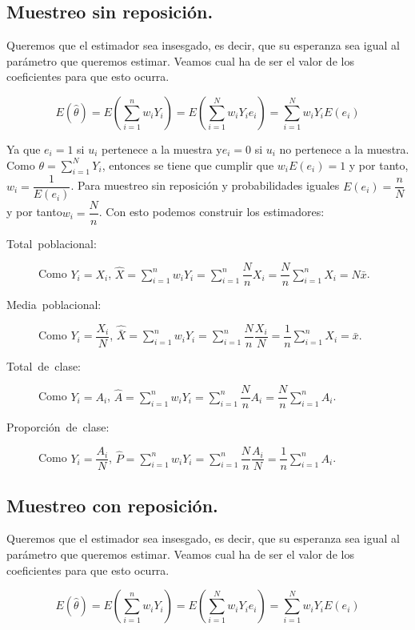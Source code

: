 \subsection{Muestreo sin reposici\'on.}

Queremos que el estimador sea insesgado, es decir, que su esperanza
sea igual al par\'ametro que queremos estimar. Veamos cual ha de ser
el valor de los coeficientes para que esto ocurra.

\[
E\left(\hat{\theta}\right)=E\left(\sum_{i=1}^{n}w_{i}Y_{i}\right)=E\left(\sum_{i=1}^{N}w_{i}Y_{i}e_{i}\right)=\sum_{i=1}^{N}w_{i}Y_{i}E\left(e_{i}\right)
\]


Ya que $e_{i}=1$ si $u_{i}$ pertenece a la muestra y$e_{i}=0$ si
$u_{i}$ no pertenece a la muestra. Como $\theta=\sum_{i=1}^{N}Y_{i}$,
entonces se tiene que cumplir que $w_{i}E\left(e_{i}\right)=1$ y
por tanto, $w_{i}=\dfrac{1}{E\left(e_{i}\right)}$. Para muestreo
sin reposici\'on y probabilidades iguales $E\left(e_{i}\right)=\dfrac{n}{N}$
y por tanto$w_{i}=\dfrac{N}{n}$. Con esto podemos construir los estimadores:
\begin{description}
\item [{Total~poblacional:}] Como $Y_{i}=X_{i}$, $\hat{X}=\sum_{i=1}^{n}w_{i}Y_{i}=\sum_{i=1}^{n}\dfrac{N}{n}X_{i}=\dfrac{N}{n}\sum_{i=1}^{n}X_{i}=N\bar{x}$.
\item [{Media~poblacional:}] Como $Y_{i}=\dfrac{X_{i}}{N}$, $\hat{\bar{X}}=\sum_{i=1}^{n}w_{i}Y_{i}=\sum_{i=1}^{n}\dfrac{N}{n}\dfrac{X_{i}}{N}=\dfrac{1}{n}\sum_{i=1}^{n}X_{i}=\bar{x}$.
\item [{Total~de~clase:}] Como $Y_{i}=A_{i}$, $\hat{A}=\sum_{i=1}^{n}w_{i}Y_{i}=\sum_{i=1}^{n}\dfrac{N}{n}A_{i}=\dfrac{N}{n}\sum_{i=1}^{n}A_{i}$.
\item [{Proporci\'on~de~clase:}] Como $Y_{i}=\dfrac{A_{i}}{N}$, $\hat{P}=\sum_{i=1}^{n}w_{i}Y_{i}=\sum_{i=1}^{n}\dfrac{N}{n}\dfrac{A_{i}}{N}=\dfrac{1}{n}\sum_{i=1}^{n}A_{i}$.
\end{description}

\subsection{Muestreo con reposici\'on.}

Queremos que el estimador sea insesgado, es decir, que su esperanza
sea igual al par\'ametro que queremos estimar. Veamos cual ha de ser
el valor de los coeficientes para que esto ocurra.

\[
E\left(\hat{\theta}\right)=E\left(\sum_{i=1}^{n}w_{i}Y_{i}\right)=E\left(\sum_{i=1}^{N}w_{i}Y_{i}e_{i}\right)=\sum_{i=1}^{N}w_{i}Y_{i}E\left(e_{i}\right)
\]


